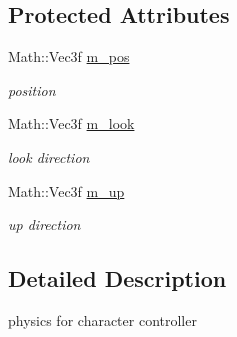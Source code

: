 \subsection*{Protected Attributes}
\begin{DoxyCompactItemize}
\item 
\hypertarget{classContent_1_1Actor_1_1Physics_1_1Controller_a164cdb201dc19b8c1e91e46505e24336}{
Math::Vec3f \hyperlink{classContent_1_1Actor_1_1Physics_1_1Controller_a164cdb201dc19b8c1e91e46505e24336}{m\_\-pos}}
\label{classContent_1_1Actor_1_1Physics_1_1Controller_a164cdb201dc19b8c1e91e46505e24336}

\begin{DoxyCompactList}\small\item\em position \item\end{DoxyCompactList}\item 
\hypertarget{classContent_1_1Actor_1_1Physics_1_1Controller_a61768d646d15b88ca8272cfed752a1c1}{
Math::Vec3f \hyperlink{classContent_1_1Actor_1_1Physics_1_1Controller_a61768d646d15b88ca8272cfed752a1c1}{m\_\-look}}
\label{classContent_1_1Actor_1_1Physics_1_1Controller_a61768d646d15b88ca8272cfed752a1c1}

\begin{DoxyCompactList}\small\item\em look direction \item\end{DoxyCompactList}\item 
\hypertarget{classContent_1_1Actor_1_1Physics_1_1Controller_aafe24fe5f9acd67760cf83314fdabda8}{
Math::Vec3f \hyperlink{classContent_1_1Actor_1_1Physics_1_1Controller_aafe24fe5f9acd67760cf83314fdabda8}{m\_\-up}}
\label{classContent_1_1Actor_1_1Physics_1_1Controller_aafe24fe5f9acd67760cf83314fdabda8}

\begin{DoxyCompactList}\small\item\em up direction \item\end{DoxyCompactList}\end{DoxyCompactItemize}


\subsection{Detailed Description}
physics for character controller 

